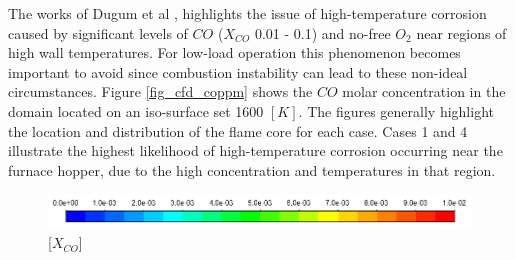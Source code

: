 \documentclass[11pt,cleanfoot]{asme2ej}
\begin{document}
The works of Dugum et al \cite{ugum2019}, highlights the issue of high-temperature corrosion caused by significant levels of $CO$ ($X_{CO}$ 0.01 - 0.1) and no-free $O_2$ near regions of high wall temperatures. For low-load operation this phenomenon becomes important to avoid since combustion instability can lead to these non-ideal circumstances. Figure \ref{fig_cfd_coppm} shows the $CO$ molar concentration in the domain located on an iso-surface set 1600 $[K]$. The figures generally highlight the location and distribution of the flame core for each case. Cases 1 and 4 illustrate the highest likelihood of high-temperature corrosion occurring near the furnace hopper, due to the high concentration and temperatures in that region.\\
\begin{figure}[h!]
\centering
\includegraphics[width = 5in]{CO_MF_KEY} [$X_{CO}$]\\

\end{figure}
\end{document}
